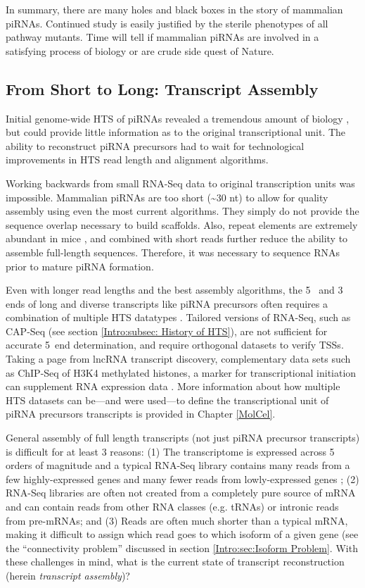     In summary, there are many holes and black boxes in the story of mammalian piRNAs. Continued study is easily justified by the sterile phenotypes of all pathway mutants. Time will tell if mammalian piRNAs are involved in a satisfying process of biology or are crude side quest of Nature.

  \subsection{From Short to Long: Transcript Assembly}
    \label{Intro:subsec:Tx Assembly}

    Initial genome-wide HTS of piRNAs revealed a tremendous amount of biology \citep{Gunawardane2007,Brennecke2007}, but could provide little information as to the original transcriptional unit. The ability to reconstruct piRNA precursors had to wait for technological improvements in HTS read length and alignment algorithms.

    Working backwards from small RNA-Seq data to original transcription units was impossible. Mammalian piRNAs are too short (\textasciitilde30 nt) to allow for quality assembly using even the most current algorithms. They simply do not provide the sequence overlap necessary to build scaffolds. Also, repeat elements are extremely abundant in mice \citep{Nellaker2012}, and combined with short reads further reduce the ability to assemble full-length sequences. Therefore, it was necessary to sequence RNAs prior to mature piRNA formation.

    Even with longer read lengths and the best assembly algorithms, the 5\textprime~ and 3\textprime~ ends of long and diverse transcripts like piRNA precursors often requires a combination of multiple HTS datatypes \citep{Blower2013,Li2013e}. Tailored versions of RNA-Seq, such as CAP-Seq (see section \ref{Intro:subsec: History of HTS}), are not sufficient for accurate 5\textprime~end determination, and require orthogonal datasets to verify TSSs. Taking a page from lncRNA transcript discovery, complementary data sets such as ChIP-Seq of H3K4 methylated histones, a marker for transcriptional initiation can supplement RNA expression data \citep{Khalil2009}. More information about how multiple HTS datasets can be---and were used---to define the transcriptional unit of piRNA precursors transcripts is provided in Chapter \ref{MolCel}.

    General assembly of full length transcripts (not just piRNA precursor transcripts) is difficult for at least 3 reasons: (1) The transcriptome is expressed across 5 orders of magnitude and a typical RNA-Seq library contains many reads from a few highly-expressed genes and many fewer reads from lowly-expressed genes \citep{Blencowe2009}; (2) RNA-Seq libraries are often not created from a completely pure source of mRNA and can contain reads from other RNA classes (e.g. tRNAs) or intronic reads from pre-mRNAs; and (3) Reads are often much shorter than a typical mRNA, making it difficult to assign which read goes to which isoform of a given gene (see the ``connectivity problem'' discussed in section \ref{Intro:sec:Isoform Problem}. With these challenges in mind, what is the current state of transcript reconstruction (herein \textit{transcript assembly})?

